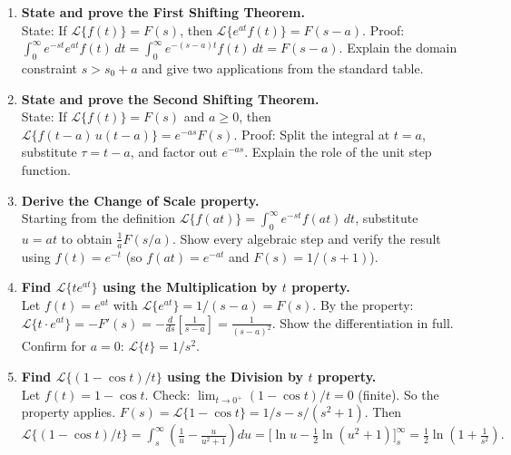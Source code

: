 \documentclass[12pt,a4paper]{article}
\begin{document}
\begin{enumerate}

\item \textbf{State and prove the First Shifting Theorem.}\\
State: If $\mathcal{L}\{f(t)\} = F(s)$, then $\mathcal{L}\{e^{at}f(t)\} = F(s-a)$.
Proof: $\int_0^\infty e^{-st}e^{at}f(t)\,dt = \int_0^\infty e^{-(s-a)t}f(t)\,dt = F(s-a).$
Explain the domain constraint $s > s_0 + a$ and give two applications from the standard table.

\item \textbf{State and prove the Second Shifting Theorem.}\\
State: If $\mathcal{L}\{f(t)\} = F(s)$ and $a \geq 0$, then
$\mathcal{L}\{f(t-a)\,u(t-a)\} = e^{-as}F(s)$.
Proof: Split the integral at $t = a$, substitute $\tau = t - a$, and factor out $e^{-as}$.
Explain the role of the unit step function.

\item \textbf{Derive the Change of Scale property.}\\
Starting from the definition $\mathcal{L}\{f(at)\} = \int_0^\infty e^{-st}f(at)\,dt$,
substitute $u = at$ to obtain $\tfrac{1}{a}F(s/a)$. Show every algebraic step and
verify the result using $f(t) = e^{-t}$ (so $f(at) = e^{-at}$ and $F(s) = 1/(s+1)$).

\item \textbf{Find $\mathcal{L}\{te^{at}\}$ using the Multiplication by $t$ property.}\\
Let $f(t) = e^{at}$ with $\mathcal{L}\{e^{at}\} = 1/(s-a) = F(s)$.
By the property: $\mathcal{L}\{t\cdot e^{at}\} = -F'(s) = -\frac{d}{ds}\left[\frac{1}{s-a}\right]
= \frac{1}{(s-a)^2}.$ Show the differentiation in full. Confirm for $a=0$:
$\mathcal{L}\{t\} = 1/s^2$. \checkmark

\item \textbf{Find $\mathcal{L}\{(1-\cos t)/t\}$ using the Division by $t$ property.}\\
Let $f(t) = 1 - \cos t$. Check: $\lim_{t\to 0^+}(1-\cos t)/t = 0$ (finite). So the property
applies.
$F(s) = \mathcal{L}\{1-\cos t\} = 1/s - s/(s^2+1).$
Then $\mathcal{L}\{(1-\cos t)/t\} = \int_s^\infty \left(\frac{1}{u} - \frac{u}{u^2+1}\right)du
= \Big[\ln u - \tfrac{1}{2}\ln(u^2+1)\Big]_s^\infty
= \tfrac{1}{2}\ln\!\left(1 + \tfrac{1}{s^2}\right).$

\end{enumerate}

\end{document}
